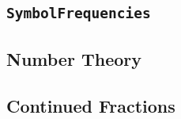 
\subsection{\texttt{SymbolFrequencies}}
\subsection{Number Theory}
\subsection{Continued Fractions}
